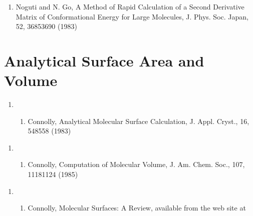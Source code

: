 \documentclass[letterpaper,11pt,english]{sphinxmanual}
\begin{document}
\begin{enumerate}
%
\setcounter{enumi}{19}
\item {} 
Noguti and N. Go, A Method of Rapid Calculation of a Second Derivative Matrix of Conformational Energy for Large Molecules, J. Phys. Soc. Japan, 52, 3685\sphinxhyphen{}3690 (1983)

\end{enumerate}


\section{Analytical Surface Area and Volume}
\label{\detokenize{text/references:analytical-surface-area-and-volume}}\begin{enumerate}
%
\setcounter{enumi}{12}
\item {} \begin{enumerate}
%
\setcounter{enumii}{11}
\item {} 
Connolly, Analytical Molecular Surface Calculation, J. Appl. Cryst., 16, 548\sphinxhyphen{}558 (1983)

\end{enumerate}

\end{enumerate}
\begin{enumerate}
%
\setcounter{enumi}{12}
\item {} \begin{enumerate}
%
\setcounter{enumii}{11}
\item {} 
Connolly, Computation of Molecular Volume, J. Am. Chem. Soc., 107, 1118\sphinxhyphen{}1124 (1985)

\end{enumerate}

\end{enumerate}
\begin{enumerate}
%
\setcounter{enumi}{12}
\item {} \begin{enumerate}
%
\setcounter{enumii}{11}
\item {} 
Connolly, Molecular Surfaces: A Review, available from the web site at 

\end{enumerate}

\end{enumerate}
\end{document}
